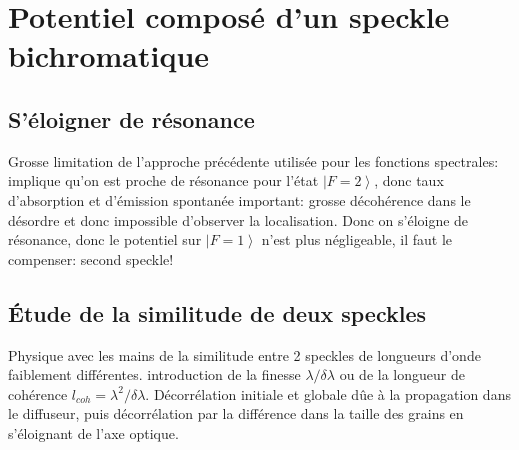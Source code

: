 \section{Potentiel composé d'un speckle bichromatique}
\subsection{S'éloigner de résonance}
Grosse limitation de l'approche précédente utilisée pour les fonctions spectrales: implique qu'on est proche de résonance pour l'état $\left| F=2 \right\rangle$, donc taux d'absorption et d'émission spontanée important: grosse décohérence dans le désordre et donc impossible d'observer la localisation.
Donc on s'éloigne de résonance, donc le potentiel sur $\left| F=1 \right\rangle$ n'est plus négligeable, il faut le compenser: second speckle! 
\subsection{Étude de la similitude de deux speckles}
Physique avec les mains de la similitude entre 2 speckles de longueurs d'onde faiblement différentes. introduction de la finesse $\lambda / \delta\lambda$ ou de la longueur de cohérence $l_{coh}=\lambda^2/\delta\lambda$.
Décorrélation initiale et globale dûe à la propagation dans le diffuseur, puis décorrélation par la différence dans la taille des grains en s'éloignant de l'axe optique.